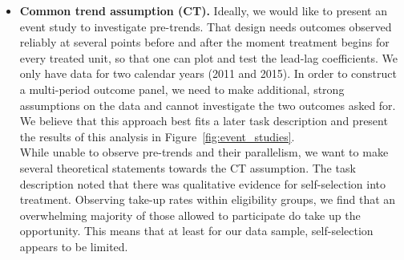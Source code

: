 \documentclass{scrartcl}
\begin{document}
\begin{itemize}[label=$\blacktriangleright$]
    \item \textbf{Common trend assumption (CT).} Ideally, we would like to present an event study to investigate pre-trends. That design needs outcomes observed reliably at several points before and after the moment treatment begins for every treated unit, so that one can plot and test the lead-lag coefficients. We only have data for two calendar years (2011 and 2015). In order to construct a multi-period outcome panel, we need to make additional, strong assumptions on the data and cannot investigate the two outcomes asked for. We believe that this approach best fits a later task description and present the results of this analysis in Figure~\ref{fig:event_studies}. \\
    
    While unable to observe pre-trends and their parallelism, we want to make several theoretical statements towards the CT assumption. The task description noted that there was qualitative evidence for self-selection into treatment. Observing take-up rates within eligibility groups, we find that an overwhelming majority of those allowed to participate do take up the opportunity. This means that at least for our data sample, self-selection appears to be limited. 
    

\end{itemize}
\end{document}
